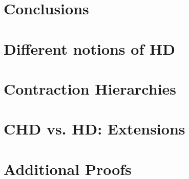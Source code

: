 \documentclass[opre,nonblindrev]{informs3} %
\begin{document}
\section{Conclusions}
\label{sec:conclu}




\begin{APPENDICES}
\section{Different notions of HD}
\label{app:generalhd}


\section{Contraction Hierarchies}


\section{CHD vs. HD: Extensions}
\label{app:extn}



\section{Additional Proofs}
\label{sec:proofs}

\end{APPENDICES}






\end{document}

